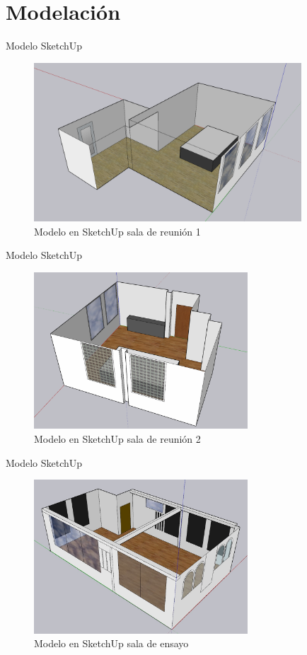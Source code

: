 \documentclass{sintefbeamer}
\begin{document}
\section{Modelación}
\begin{frame}{Modelo SketchUp}
    \begin{figure}
        \centering
        \includegraphics[width=10cm]{images/Sketchup/Sala 1 Sketchup.png}
        \caption{Modelo en SketchUp sala de reunión 1}
        \label{fig:skp sala 1}
    \end{figure}
\end{frame}

\begin{frame}{Modelo SketchUp}
    \begin{figure}
        \centering
        \includegraphics[width=8cm]{images/Sketchup/Sala 2 Sketchup.png}
        \caption{Modelo en SketchUp sala de reunión 2}
        \label{fig:skp sala 2}
    \end{figure}
\end{frame}

\begin{frame}{Modelo SketchUp}
    \begin{figure}
        \centering
        \includegraphics[width=8cm]{images/Sketchup/Sala ensayo Sketchup.jpg}
        \caption{Modelo en SketchUp sala de ensayo}
        \label{fig:skp sala ensayo}
    \end{figure}
\end{frame}
\end{document}
